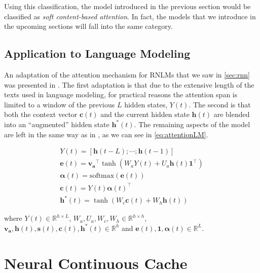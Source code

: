 Using this classification, the model introduced in the previous section would be classified as \textit{soft content-based attention}. In fact, the models that we introduce in the upcoming sections will fall into the same category.

\subsection{Application to Language Modeling}


An adaptation of the attention mechanism for RNLMs that we saw in \ref{sec:rnn} was presented in \cite{daniluk2017frustratingly}. The first adaptation is that due to the extensive length of the texts used in language modeling, for practical reasons the attention span is limited to a window of the previous $L$ hidden states, $Y(t)$. The second is that both the context vector $\mathbf{c}(t)$ and the current hidden state $\mathbf{h}(t)$ are blended into an ``augmented'' hidden state $\mathbf{h^*}(t)$. The remaining aspects of the model are left in the same way as in \cite{bahdanau2014neural}, as we can see in \autoref{eq:attentionLM}.

\begin{equation} \label{eq:attentionLM}
	\begin{gathered}
		Y(t) = [\mathbf{h}(t-L) ; \cdots ; \mathbf{h}(t-1)] \\
		\mathbf{e}(t) = \mathbf{v_a}^{\top} \tanh(W_a Y(t) + U_a\mathbf{h}(t)\mathbf{1}^{\top}) \\
		\boldsymbol{\alpha}(t) = \text{softmax}(\mathbf{e}(t)) \\
		\mathbf{c}(t) = Y(t)\boldsymbol{\alpha}(t)^{\top} \\
		\mathbf{h^*}(t) = \tanh(W_c \mathbf{c}(t) + W_h \mathbf{h}(t))
	\end{gathered}	
\end{equation}

where $Y(t) \in \mathbb{R}^{h \times L}$, $W_a,U_a,W_c,W_h \in \mathbb{R}^{h \times h}$, $\mathbf{v_a},\mathbf{h}(t),\mathbf{s}(t),\mathbf{c}(t),\mathbf{h^*}(t) \in \mathbb{R}^{h}$ and $\mathbf{e}(t), \mathbf{1}, \boldsymbol{\alpha}(t) \in \mathbb{R}^{L}$.

\section{Neural Continuous Cache}
\label{sec:continuousCache}

